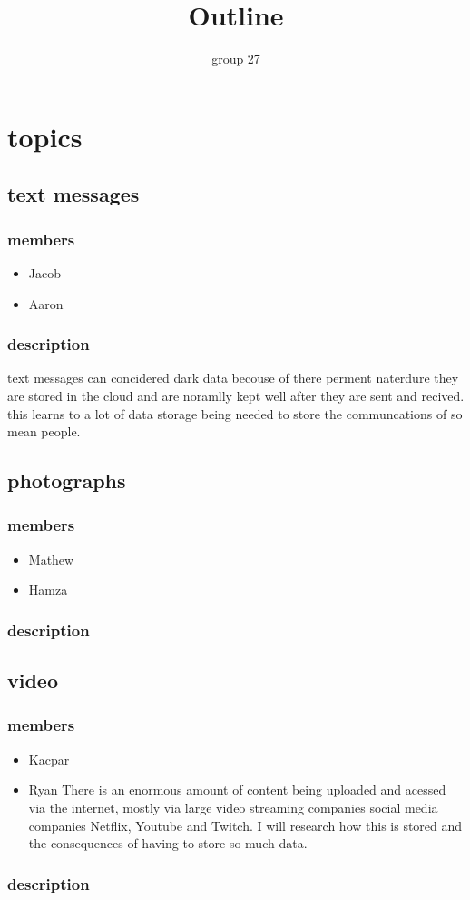 \documentclass{article}
\begin{document}
\title{Outline}
\author{group 27}

\maketitle
\newpage


\section{topics}
\subsection{text messages} 
\subsubsection{members}
\begin{itemize}
    \item Jacob
    \item Aaron
\end{itemize}
\subsubsection{description}
 text messages can concidered dark data becouse of there perment naterdure they are stored in the cloud and 
 are noramlly kept well after they are sent and recived. this learns to a lot of data storage being needed to
 store the communcations of so mean people.

\subsection{photographs}
\subsubsection{members}
\begin{itemize}
    \item Mathew
    \item Hamza
\end{itemize}
\subsubsection{description}

\subsection{video}
\subsubsection{members}
\begin{itemize}
    \item Kacpar
    
    \item Ryan
    There is an enormous amount of content being uploaded and acessed via the internet, mostly via large video 
    streaming companies social media companies Netflix, Youtube and Twitch. I will research
    how this is stored and the consequences of having to store so much data.
\end{itemize}
\subsubsection{description}
\end{document}
